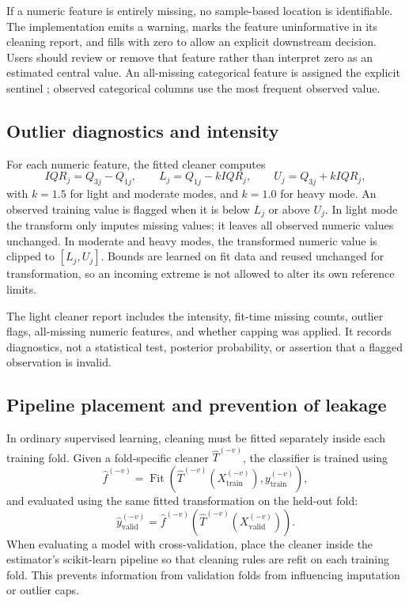\documentclass[conference]{IEEEtran}
\begin{document}
If a numeric feature is entirely missing, no sample-based location is identifiable. The implementation emits a warning, marks the feature uninformative in its cleaning report, and fills with zero to allow an explicit downstream decision. Users should review or remove that feature rather than interpret zero as an estimated central value. An all-missing categorical feature is assigned the explicit sentinel ; observed categorical columns use the most frequent observed value.

\subsection{Outlier diagnostics and intensity}
For each numeric feature, the fitted cleaner computes
\[
IQR_j=Q_{3j}-Q_{1j},\qquad
L_j=Q_{1j}-k IQR_j,\qquad
U_j=Q_{3j}+k IQR_j,
\]
with \(k=1.5\) for light and moderate modes, and \(k=1.0\) for heavy mode. An observed training value is flagged when it is below \(L_j\) or above \(U_j\). In light mode the transform only imputes missing values; it leaves all observed numeric values unchanged. In moderate and heavy modes, the transformed numeric value is clipped to \([L_j,U_j]\). Bounds are learned on fit data and reused unchanged for transformation, so an incoming extreme is not allowed to alter its own reference limits.

The light cleaner report includes the intensity, fit-time missing counts, outlier flags, all-missing numeric features, and whether capping was applied. It records diagnostics, not a statistical test, posterior probability, or assertion that a flagged observation is invalid.

\subsection{Pipeline placement and prevention of leakage}
In ordinary supervised learning, cleaning must be fitted separately inside each training fold. Given a fold-specific cleaner \(\widehat T^{(-v)}\), the classifier is trained using
\[
\widehat f^{(-v)}
=\operatorname{Fit}\left(
\widehat T^{(-v)}(X_{\mathrm{train}}^{(-v)}),
y_{\mathrm{train}}^{(-v)}
\right),
\]
and evaluated using the same fitted transformation on the held-out fold:
\[
\widehat y_{\mathrm{valid}}^{(-v)}
=\widehat f^{(-v)}
\left(\widehat T^{(-v)}(X_{\mathrm{valid}}^{(-v)})\right).
\]
When evaluating a model with cross-validation, place the cleaner inside the estimator's scikit-learn pipeline so that cleaning rules are refit on each training fold. This prevents information from validation folds from influencing imputation or outlier caps.
\end{document}
